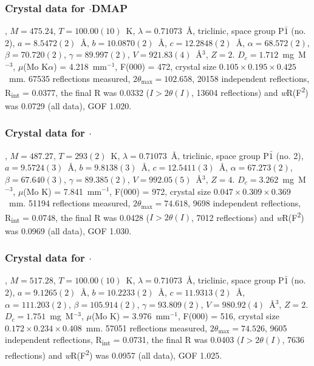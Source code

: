 \begin{refsection}
\subsubsection{Crystal data for \texorpdfstring{$\cdot$DMAP}{C20 H18 Br N3 O Se}}
, $M=475.24$, $T=100.00(10)$~K, $\lambda=0.71073$~\AA, triclinic, space group P$\bar{1}$ (no. 2), $a = 8.5472(2)$~\AA, $b = 10.0870(2)$~\AA, $c = 12.2848(2)$~\AA, $\alpha = 68.572(2)$\degree, $\beta = 70.720(2)$\degree, $\gamma = 89.997(2)$\degree, $V = 921.83(4)$~\AA$^{3}$, $Z = 2$. $D_{c}= 1.712$~mg~M$^{-3}$, $\mu$(Mo K$\alpha$) = 4.218~mm$^{-1}$, F(000) = 472, crystal size $0.105 \times 0.195 \times 0.425$~mm. 67535 reflections measured, $2\theta_{\mathrm{max}}=102.658$\degree, 20158 independent reflections, R\textsubscript{int} = 0.0377, the final R was 0.0332 ($I > 2\theta(I)$, 13604 reflections) and \emph{w}R(F\textsuperscript{2}) was 0.0729 (all data), GOF 1.020.

\subsubsection{Crystal data for \texorpdfstring{$\cdot$}{C22 H20 Br N2 O Se}}
, $M=487.27$, $T=293(2)$~K, $\lambda=0.71073$~\AA, triclinic, space group P$\bar{1}$ (no. 2), $a = 9.5724(3)$~\AA, $b = 9.8138(3)$~\AA, $c = 12.5411(3)$~\AA, $\alpha = 67.273(2)$\degree, $\beta = 67.640(3)$\degree, $\gamma = 89.385(2)$\degree, $V = 992.05(5)$~\AA$^{3}$, $Z = 4$. $D_{c}= 3.262$~mg~M$^{-3}$, $\mu$(Mo K\a) = 7.841~mm$^{-1}$, F(000) = 972, crystal size $0.047 \times 0.309 \times 0.369$~mm. 51194 reflections measured, $2\theta_{\mathrm{max}}=74.618$\degree, 9698 independent reflections, R\textsubscript{int} = 0.0748, the final R was 0.0428 ($I > 2\theta(I)$, 7012 reflections) and \emph{w}R(F\textsuperscript{2}) was 0.0969 (all data), GOF 1.030.

\subsubsection{Crystal data for \texorpdfstring{$\cdot$}{C22 H20 Br N3 O2 Se}}
, $M=517.28$, $T=100.00(10)$~K, $\lambda=0.71073$~\AA, triclinic, space group P$\bar{1}$ (no. 2), $a = 9.1265(2)$~\AA, $b = 10.2233(2)$~\AA, $c = 11.9313(2)$~\AA, $\alpha = 111.203(2)$\degree, $\beta = 105.914(2)$\degree, $\gamma = 93.809(2)$\degree, $V = 980.92(4)$~\AA$^{3}$, $Z = 2$. $D_{c}= 1.751$~mg~M$^{-3}$, $\mu$(Mo K\a) = 3.976~mm$^{-1}$, F(000) = 516, crystal size $0.172 \times 0.234 \times 0.408$~mm. 57051 reflections measured, $2\theta_{\mathrm{max}}=74.526$\degree, 9605 independent reflections, R\textsubscript{int} = 0.0731, the final R was 0.0403 ($I > 2\theta(I)$, 7636 reflections) and \emph{w}R(F\textsuperscript{2}) was 0.0957 (all data), GOF 1.025.


\end{refsection}
